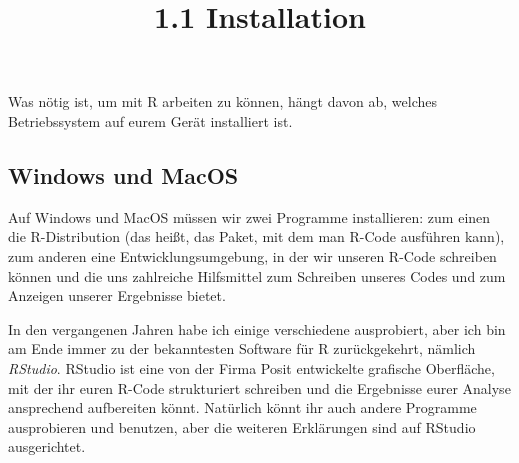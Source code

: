 \documentclass[
  letterpaper,
  DIV=11,
  numbers=noendperiod]{scrartcl}
\title{1.1 Installation}
\author{}
\date{}
\begin{document}
\maketitle
\ifdefined\Shaded\renewenvironment{Shaded}{\begin{tcolorbox}[sharp corners, borderline west={3pt}{0pt}{shadecolor}, boxrule=0pt, breakable, enhanced, interior hidden, frame hidden]}{\end{tcolorbox}}\fi

Was nötig ist, um mit R arbeiten zu können, hängt davon ab, welches
Betriebssystem auf eurem Gerät installiert ist.

\hypertarget{windows-und-macos}{%
\subsection{Windows und MacOS}\label{windows-und-macos}}

Auf Windows und MacOS müssen wir zwei Programme installieren: zum einen
die R-Distribution (das heißt, das Paket, mit dem man R-Code ausführen
kann), zum anderen eine Entwicklungsumgebung, in der wir unseren R-Code
schreiben können und die uns zahlreiche Hilfsmittel zum Schreiben
unseres Codes und zum Anzeigen unserer Ergebnisse bietet.

In den vergangenen Jahren habe ich einige verschiedene ausprobiert, aber
ich bin am Ende immer zu der bekanntesten Software für R zurückgekehrt,
nämlich \emph{RStudio}. RStudio ist eine von der Firma Posit entwickelte
grafische Oberfläche, mit der ihr euren R-Code strukturiert schreiben
und die Ergebnisse eurer Analyse ansprechend aufbereiten könnt.
Natürlich könnt ihr auch andere Programme ausprobieren und benutzen,
aber die weiteren Erklärungen sind auf RStudio ausgerichtet.
\end{document}
